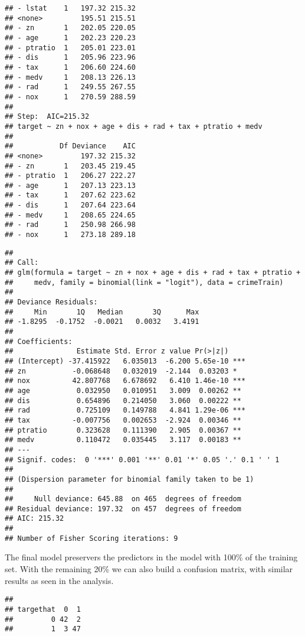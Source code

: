 \documentclass[
]{article}
\begin{document}
\begin{verbatim}
## - lstat    1   197.32 215.32
## <none>         195.51 215.51
## - zn       1   202.05 220.05
## - age      1   202.23 220.23
## - ptratio  1   205.01 223.01
## - dis      1   205.96 223.96
## - tax      1   206.60 224.60
## - medv     1   208.13 226.13
## - rad      1   249.55 267.55
## - nox      1   270.59 288.59
## 
## Step:  AIC=215.32
## target ~ zn + nox + age + dis + rad + tax + ptratio + medv
## 
##           Df Deviance    AIC
## <none>         197.32 215.32
## - zn       1   203.45 219.45
## - ptratio  1   206.27 222.27
## - age      1   207.13 223.13
## - tax      1   207.62 223.62
## - dis      1   207.64 223.64
## - medv     1   208.65 224.65
## - rad      1   250.98 266.98
## - nox      1   273.18 289.18
\end{verbatim}

\begin{verbatim}
## 
## Call:
## glm(formula = target ~ zn + nox + age + dis + rad + tax + ptratio + 
##     medv, family = binomial(link = "logit"), data = crimeTrain)
## 
## Deviance Residuals: 
##     Min       1Q   Median       3Q      Max  
## -1.8295  -0.1752  -0.0021   0.0032   3.4191  
## 
## Coefficients:
##               Estimate Std. Error z value Pr(>|z|)    
## (Intercept) -37.415922   6.035013  -6.200 5.65e-10 ***
## zn           -0.068648   0.032019  -2.144  0.03203 *  
## nox          42.807768   6.678692   6.410 1.46e-10 ***
## age           0.032950   0.010951   3.009  0.00262 ** 
## dis           0.654896   0.214050   3.060  0.00222 ** 
## rad           0.725109   0.149788   4.841 1.29e-06 ***
## tax          -0.007756   0.002653  -2.924  0.00346 ** 
## ptratio       0.323628   0.111390   2.905  0.00367 ** 
## medv          0.110472   0.035445   3.117  0.00183 ** 
## ---
## Signif. codes:  0 '***' 0.001 '**' 0.01 '*' 0.05 '.' 0.1 ' ' 1
## 
## (Dispersion parameter for binomial family taken to be 1)
## 
##     Null deviance: 645.88  on 465  degrees of freedom
## Residual deviance: 197.32  on 457  degrees of freedom
## AIC: 215.32
## 
## Number of Fisher Scoring iterations: 9
\end{verbatim}

The final model preservers the predictors in the model with 100\% of the
training set. With the remaining 20\% we can also build a confusion
matrix, with similar results as seen in the analysis.

\begin{verbatim}
##          
## targethat  0  1
##         0 42  2
##         1  3 47
\end{verbatim}
\end{document}
